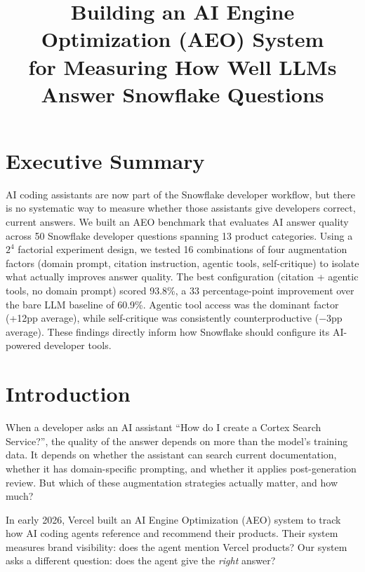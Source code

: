 \documentclass[11pt,letterpaper]{article}
\title{\Large\bfseries Building an AI Engine Optimization (AEO) System\\for Measuring How Well LLMs Answer Snowflake Questions}
\author{}
\date{}
\begin{document}
\maketitle
\thispagestyle{empty}

\section*{Executive Summary}

AI coding assistants are now part of the Snowflake developer workflow, but there is no systematic way to measure whether those assistants give developers correct, current answers. We built an AEO benchmark that evaluates AI answer quality across 50 Snowflake developer questions spanning 13 product categories. Using a $2^4$ factorial experiment design, we tested 16 combinations of four augmentation factors (domain prompt, citation instruction, agentic tools, self-critique) to isolate what actually improves answer quality. The best configuration (citation + agentic tools, no domain prompt) scored 93.8\%, a 33 percentage-point improvement over the bare LLM baseline of 60.9\%. Agentic tool access was the dominant factor (+12pp average), while self-critique was consistently counterproductive ($-$3pp average). These findings directly inform how Snowflake should configure its AI-powered developer tools.

\section{Introduction}

When a developer asks an AI assistant ``How do I create a Cortex Search Service?'', the quality of the answer depends on more than the model's training data. It depends on whether the assistant can search current documentation, whether it has domain-specific prompting, and whether it applies post-generation review. But which of these augmentation strategies actually matter, and how much?

In early 2026, Vercel built an AI Engine Optimization (AEO) system to track how AI coding agents reference and recommend their products. Their system measures brand visibility: does the agent mention Vercel products? Our system asks a different question: does the agent give the \emph{right} answer?
\end{document}

